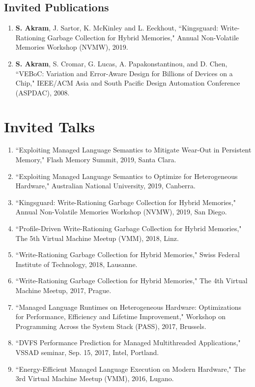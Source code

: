 \documentclass[singlecolumn,singlespace,11pt]{article}
\begin{document}
\subsection*{Invited Publications}
\begin{enumerate}
\item
\textbf{S. Akram}, J. Sartor, K. McKinley and L. Eeckhout, ``Kingsguard: Write-Rationing Garbage Collection for Hybrid Memories," Annual Non-Volatile Memories Workshop (NVMW), 2019. 

\item
\textbf{S. Akram}, S. Cromar, G. Lucas, A. Papakonstantinou, and D. Chen, ``VEBoC: Variation and Error-Aware Design for Billions of Devices on a Chip," 
IEEE/ACM Asia and South Pacific Design Automation Conference (ASPDAC), 2008.
\end{enumerate}


\section*{Invited Talks}
\begin{enumerate}
\item ``Exploiting Managed Language Semantics to Mitigate Wear-Out in Persistent Memory," Flash Memory Summit, 2019, Santa Clara.
\item ``Exploiting Managed Language Semantics to Optimize for Heterogeneous Hardware," Australian National University, 2019, Canberra.
\item ``Kingsguard: Write-Rationing Garbage Collection for Hybrid Memories," Annual Non-Volatile Memories Workshop (NVMW), 2019, San Diego.
\item ``Profile-Driven Write-Rationing Garbage Collection for Hybrid Memories," The 5th Virtual Machine Meetup (VMM), 2018, Linz.
\item ``Write-Rationing Garbage Collection for Hybrid Memories," Swiss Federal Institute of Technology, 2018, Lausanne.
\item ``Write-Rationing Garbage Collection for Hybrid Memories," The 4th Virtual Machine Meetup, 2017, Prague.
\item ``Managed Language Runtimes on Heterogeneous Hardware: Optimizations for Performance, Efficiency and Lifetime Improvement," Workshop on Programming Across the System Stack (PASS), 2017, Brussels.
\item ``DVFS Performance Prediction for Managed Multithreaded Applications," VSSAD seminar, Sep. 15, 2017, Intel, Portland.
\item ``Energy-Efficient Managed Language Execution on Modern Hardware," The 3rd Virtual Machine Meetup (VMM), 2016, Lugano.
\end{enumerate}
\end{document}
